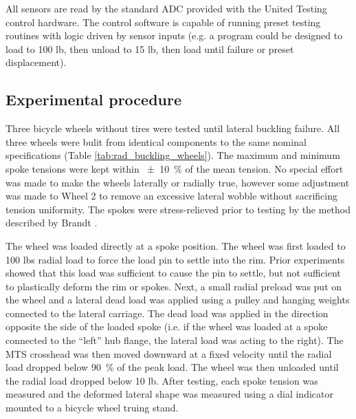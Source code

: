 \documentclass[\rootdir/thesis.tex]{subfiles}
\begin{document}
All sensors are read by the standard ADC provided with the United Testing control hardware. The control software is capable of running preset testing routines with logic driven by sensor inputs (e.g. a program could be designed to load to 100 lb, then unload to 15 lb, then load until failure or preset displacement).

\subsection{Experimental procedure}

Three bicycle wheels without tires were tested until lateral buckling failure. All three wheels were bulit from identical components to the same nominal specifications (Table \ref{tab:rad_buckling_wheels}). The maximum and minimum spoke tensions were kept within \SI{+-10}{\percent} of the mean tension. No special effort was made to make the wheels laterally or radially true, however some adjustment was made to Wheel 2 to remove an excessive lateral wobble without sacrificing tension uniformity. The spokes were stress-relieved prior to testing by the method described by Brandt \cite{Brandt1993}.

The wheel was loaded directly at a spoke position. The wheel was first loaded to 100 lbs radial load to force the load pin to settle into the rim. Prior experiments showed that this load was sufficient to cause the pin to settle, but not sufficient to plastically deform the rim or spokes. Next, a small radial preload was put on the wheel and a lateral dead load was applied using a pulley and hanging weights connected to the lateral carriage. The dead load was applied in the direction opposite the side of the loaded spoke (i.e. if the wheel was loaded at a spoke connected to the ``left'' hub flange, the lateral load was acting to the right). The MTS crosshead was then moved downward at a fixed velocity until the radial load dropped below \SI{90}{\percent} of the peak load. The wheel was then unloaded until the radial load dropped below 10 lb. After testing, each spoke tension was measured and the deformed lateral shape was measured using a dial indicator mounted to a bicycle wheel truing stand.
\end{document}
